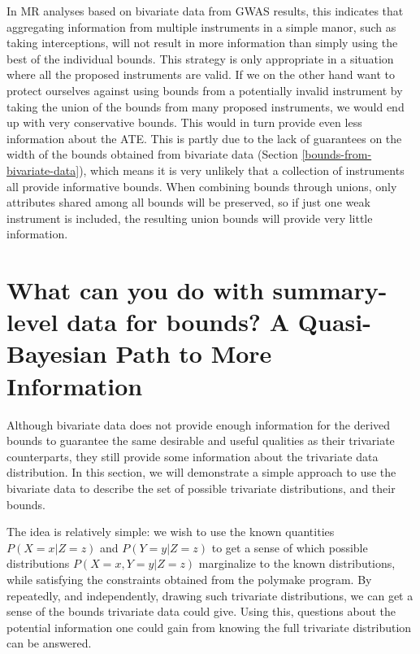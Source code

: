 \documentclass[
]{article}
\theoremstyle{plain}
\begin{document}
{In MR analyses based on bivariate data from GWAS results, this indicates that aggregating information from multiple instruments in a simple manor, such as taking interceptions, will not result in more information than simply using the best of the individual bounds. This strategy is only appropriate in a situation where all the proposed instruments are valid. If we on the other hand want to protect ourselves against using bounds from a potentially invalid instrument by taking the union of the bounds from many proposed instruments, we would end up with very conservative bounds. This would in turn provide even less information about the ATE. This is partly due to the lack of guarantees on the width of the bounds obtained from bivariate data (Section \ref{bounds-from-bivariate-data}), which means it is very unlikely that a collection of instruments all provide informative bounds. When combining bounds through unions, only attributes shared among all bounds will be preserved, so if just one weak instrument is included, the resulting union bounds will provide very little information.

\hypertarget{what-can-you-do-with-summary-level-data-for-bounds-a-quasi-bayesian-path-to-more-information}{%
\section{What can you do with summary-level data for bounds? A Quasi-Bayesian Path to More Information}\label{what-can-you-do-with-summary-level-data-for-bounds-a-quasi-bayesian-path-to-more-information}}

\label{quasi-bayesian}

Although bivariate data does not provide enough information for the derived bounds to guarantee the same desirable and useful qualities as their trivariate counterparts, they still provide some information about the trivariate data distribution. In this section, we will demonstrate a simple approach to use the bivariate data to describe the set of possible trivariate distributions, and their bounds.

The idea is relatively simple: we wish to use the known quantities \(P(X = x | Z = z)\) and \(P(Y = y | Z = z)\) to get a sense of which possible distributions \(P(X = x, Y = y | Z = z)\) marginalize to the known distributions, while satisfying the constraints obtained from the polymake program. By repeatedly, and independently, drawing such trivariate distributions, we can get a sense of the bounds trivariate data could give. Using this, questions about the potential information one could gain from knowing the full trivariate distribution can be answered.

}
\end{document}
